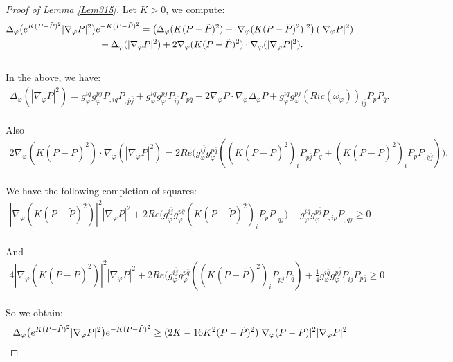 \documentclass[11pt]{amsart}
\numberwithin{equation}{section}
\begin{document}
\begin{proof}[Proof of Lemma \ref{Lem315}]
 Let $K>0$,  we compute:
\begin{align}
	& \Delta_{\varphi}\big(e^{K(P-\tilde P)^2}|\nabla_{\varphi}P|^2\big)e^{-K(P-\tilde P)^2} =\left( \Delta_{\varphi}(K(P-\tilde P)^2)+|\nabla_{\varphi}(K(P-\tilde P)^2)|^2 \right)(|\nabla_\varphi P|^2)  \notag \\
	&\qquad\qquad\qquad\qquad\qquad +\Delta_{\varphi}(|\nabla_{\varphi}P|^2) +2\nabla_{\varphi}(K(P-\tilde P)^2)\cdot \nabla_{\varphi}(|\nabla_{\varphi}P|^2).
\end{align}\\
In the above,  we have:
\begin{align}
\Delta_{\varphi}(|\nabla_{\varphi}P|^2)=g_{\varphi}^{i\bar{q}}g_{\varphi}^{p\bar{j}}P_{,iq}P_{,\bar{p}\bar{j}}+g_{\varphi}^{i\bar{q}}g_{\varphi}^{p\bar{j}}P_{i\bar{j}}P_{p\bar{q}}+2\nabla_{\varphi}P\cdot \nabla_{\varphi}\Delta_{\varphi}P+g_{\varphi}^{i\bar{q}}g_{\varphi}^{p\bar{j}}(Ric(\omega_{\varphi}))_{i\bar{j}}P_pP_{\bar{q}}.
\end{align}\\
Also
\begin{align}
2\nabla_{\varphi}(K(P-\tilde P)^2)\cdot \nabla_{\varphi}(|\nabla_{\varphi}P|^2)=2Re\big(g_{\varphi}^{i\bar{j}}g_{\varphi}^{p\bar{q}}((K(P-\tilde P)^2)_iP_{p\bar{j}}P_{\bar{q}}+(K(P-\tilde P)^2)_iP_pP_{,\bar{q}\bar{j}})\big).
\end{align}\\
We have the following completion of squares:
\begin{align}
|\nabla_{\varphi}(K(P-\tilde P)^2)|^2 |\nabla_\varphi P|^2 +2Re\big(g_{\varphi}^{i\bar{j}}g_{\varphi}^{p\bar{q}}(K(P-\tilde P)^2)_iP_pP_{,\bar{q}\bar{j}}\big)+g_{\varphi}^{i\bar{q}}g_{\varphi}^{p\bar{j}}P_{,ip}P_{,\bar{q}\bar{j}}\ge  0
\end{align}\\
And 
\begin{align}
	4|\nabla_{\varphi}(K(P-\tilde P)^2)|^2|\nabla_\varphi P|^2 + 2Re\big(g_{\varphi}^{i\bar{j}}g_{\varphi}^{p\bar{q}}((K(P-\tilde P)^2)_iP_{p\bar{j}}P_{\bar{q}}) +\frac{1}{4}g_{\varphi}^{i\bar{q}}g_{\varphi}^{p\bar{j}}P_{i\bar{j}}P_{p\bar{q}}\ge  0
\end{align}\\
So we obtain:
\begin{align}
	&\Delta_{\varphi}\big(e^{K(P-\tilde P)^2}|\nabla_{\varphi}P|^2\big)e^{-K(P-\tilde P)^2} \ge  (2K-16K^2(P-\tilde P)^2)|\nabla_\varphi(P-\tilde P)|^2 |\nabla_{\varphi}P|^2  \notag \\

\end{align}
\end{proof}
\end{document}
